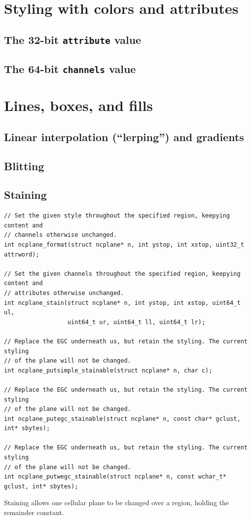 \documentclass[letterpaper,10pt]{article}
\begin{document}
\section{Styling with colors and attributes}
\subsection{The 32-bit \texttt{attribute} value}
\label{sec:attribute}
\subsection{The 64-bit \texttt{channels} value}
\label{sec:channels}

\section{Lines, boxes, and fills}
\subsection{Linear interpolation (``lerping'') and gradients}
\subsection{Blitting}
\subsection{Staining}
\label{sec:staining}
\begin{listing}[!htbp]
\begin{verbatim}
// Set the given style throughout the specified region, keepying content and
// channels otherwise unchanged.
int ncplane_format(struct ncplane* n, int ystop, int xstop, uint32_t attrword);

// Set the given channels throughout the specified region, keepying content and
// attributes otherwise unchanged.
int ncplane_stain(struct ncplane* n, int ystop, int xstop, uint64_t ul,
                  uint64_t ur, uint64_t ll, uint64_t lr);

// Replace the EGC underneath us, but retain the styling. The current styling
// of the plane will not be changed.
int ncplane_putsimple_stainable(struct ncplane* n, char c);

// Replace the EGC underneath us, but retain the styling. The current styling
// of the plane will not be changed.
int ncplane_putegc_stainable(struct ncplane* n, const char* gclust, int* sbytes);

// Replace the EGC underneath us, but retain the styling. The current styling
// of the plane will not be changed.
int ncplane_putwegc_stainable(struct ncplane* n, const wchar_t* gclust, int* sbytes);
\end{verbatim}
\caption{Staining allows one cellular plane to be changed over a region,
         holding the remainder constant.}
\label{list:stain}
\end{listing}
\end{document}
